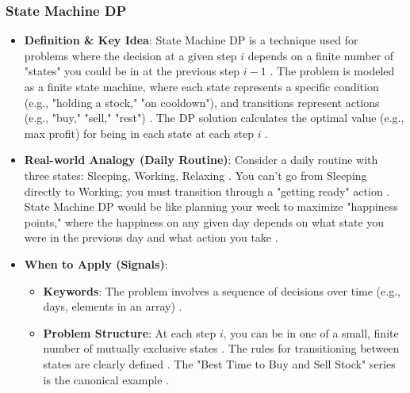 \documentclass{article}
\begin{document}
\subsubsection{State Machine DP}
\begin{itemize}
\item \textbf{Definition \& Key Idea}: State Machine DP is a technique used for problems where the decision at a given step $i$ depends on a finite number of "states" you could be in at the previous step $i-1$ \cite{812}. The problem is modeled as a finite state machine, where each state represents a specific condition (e.g., "holding a stock," "on cooldown"), and transitions represent actions (e.g., "buy," "sell," "rest") \cite{813}. The DP solution calculates the optimal value (e.g., max profit) for being in each state at each step $i$ \cite{814}.
\item \textbf{Real-world Analogy (Daily Routine)}: Consider a daily routine with three states: Sleeping, Working, Relaxing \cite{815}. You can't go from Sleeping directly to Working; you must transition through a "getting ready" action \cite{816}. State Machine DP would be like planning your week to maximize "happiness points," where the happiness on any given day depends on what state you were in the previous day and what action you take \cite{818}.
\item \textbf{When to Apply (Signals)}:
\begin{itemize}
\item \textbf{Keywords}: The problem involves a sequence of decisions over time (e.g., days, elements in an array) \cite{821}.
\item \textbf{Problem Structure}: At each step $i$, you can be in one of a small, finite number of mutually exclusive states \cite{822}. The rules for transitioning between states are clearly defined \cite{823}. The "Best Time to Buy and Sell Stock" series is the canonical example \cite{824}.
\end{itemize}
\end{itemize}
\end{document}
